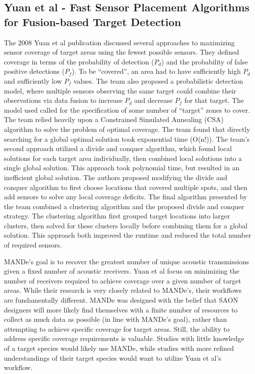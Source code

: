 \subsection{Yuan et al - Fast Sensor Placement Algorithms for Fusion-based Target Detection}
The 2008 Yuan et al publication discussed several approaches to maximizing sensor coverage of target areas using the fewest possible sensors.  They defined coverage in terms of the probability of detection ($P_d$) and the probability of false positive detections ($P_f$).  To be ``covered'', an area had to have sufficiently high $P_d$ and sufficiently low $P_f$ values.  The team also proposed a probabilistic detection model, where multiple sensors observing the same target could combine their observations via  data fusion to increase $P_d$ and decrease $P_f$ for that target. The model used called for the specification of some number of ``target'' zones to cover.  The team relied heavily upon a Constrained Simulated Annealing (CSA) algorithm to solve the problem of optimal coverage.  The team found that directly searching for a global optimal solution took exponential time (O(n!)).  The team's second approach utilized a divide and conquer algorithm, which found local solutions for each target area individually, then combined local solutions into a single global solution.  This approach took polynomial time, but resulted in an inefficient global solution.  The authors proposed modifying the divide and conquer algorithm to first choose locations that covered multiple spots, and then add sensors to solve any local coverage deficits.  The final algorithm presented by the team combined a clustering algorithm and the proposed divide and conquer strategy.  The clustering algorithm first grouped target locations into larger clusters, then solved for these clusters locally before combining them for a global solution.  This approach both improved the runtime and reduced the total number of required sensors.

MANDe's goal is to recover the greatest number of unique acoustic transmissions given a fixed number of acoustic receivers.  Yuan et al focus on minimizing the number of receivers required to achieve coverage over a given number of target areas.  While their research is very closely related to MANDe's, their workflows are fundamentally different.  MANDe was designed with the belief that SAON designers will more likely find themselves with a finite number of resources to collect as much data as possible (in line with MANDe's goal), rather than attempting to achieve specific coverage for target areas.  Still, the ability to address specific coverage requirements is valuable.  Studies with little knowledge of a target species would likely use MANDe, while studies with more refined understandings of their target species would want to utilize Yuan et al's workflow.  



